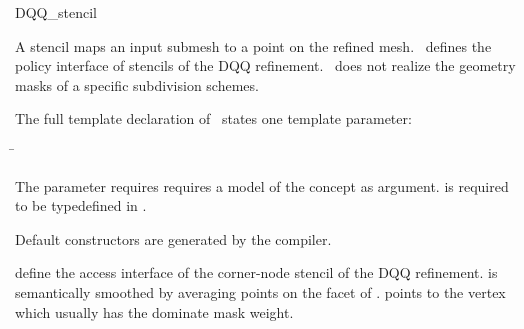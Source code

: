 \begin{ccRefClass}{DQQ_stencil}

\ccDefinition

A stencil maps an input submesh to a point on the refined 
mesh. \ccClassTemplateName\ defines the policy interface of 
stencils of the DQQ refinement. \ccClassTemplateName\ does not
realize the geometry masks of a specific subdivision schemes.


\ccParameters

The full template declaration of \ccClassTemplateName\ states one
template parameter:

\begin{tabbing}
 \= 
\end{tabbing}
   
The  parameter requires requires a model of 
the  concept as argument.  
is required to be typedefined in .

\ccCreation

Default constructors are generated by the compiler.


\ccThree{}{}{}

{define the access interface of the corner-node stencil 
of the DQQ refinement. 
 is semantically smoothed by averaging points on 
the facet of .  points to the vertex 
which usually has the dominate mask weight.}

\ccSeeAlso

\\
\\
\\

\end{ccRefClass}

\ccRefPageEnd



